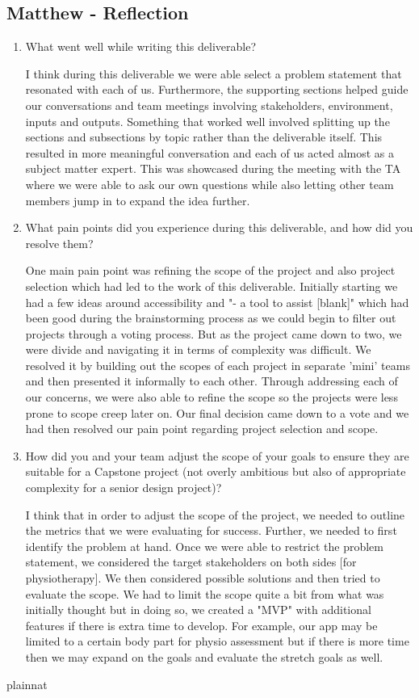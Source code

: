 \documentclass{article}
\begin{document}
\subsection*{Matthew - Reflection}
\begin{enumerate}
    \item What went well while writing this deliverable? 

    I think during this deliverable we were able select a problem statement that resonated with each of us.
    Furthermore, the supporting sections helped guide our conversations and team meetings involving stakeholders,
    environment, inputs and outputs. Something that worked well involved splitting up the sections and subsections
    by topic rather than the deliverable itself. This resulted in more meaningful conversation and each of us acted
    almost as a subject matter expert. This was showcased during the meeting with the TA where we were able to ask
    our own questions while also letting other team members jump in to expand the idea further.

    \item What pain points did you experience during this deliverable, and how
    did you resolve them?

    One main pain point was refining the scope of the project and also project selection which had led to the work
    of this deliverable. Initially starting we had a few ideas around accessibility and "- a tool to assist [blank]" which
    had been good during the brainstorming process as we could begin to filter out projects through a voting process.
    But as the project came down to two, we were divide and navigating it in terms of complexity was difficult. We resolved
    it by building out the scopes of each project in separate 'mini' teams and then presented it informally to each other.
    Through addressing each of our concerns, we were also able to refine the scope so the projects were less prone to
    scope creep later on. Our final decision came down to a vote and we had then resolved our pain point regarding project
    selection and scope.

    \item How did you and your team adjust the scope of your goals to ensure
    they are suitable for a Capstone project (not overly ambitious but also of
    appropriate complexity for a senior design project)?

    I think that in order to adjust the scope of the project, we needed to outline the metrics that we were evaluating for 
    success. Further, we needed to first identify the problem at hand. Once we were able to restrict the problem statement,
    we considered the target stakeholders on both sides [for physiotherapy]. We then considered possible solutions and then
    tried to evaluate the scope. We had to limit the scope quite a bit from what was initially thought but in doing so, we
    created a "MVP" with additional features if there is extra time to develop. For example, our app may be limited to a 
    certain body part for physio assessment but if there is more time then we may expand on the goals and evaluate the 
    stretch goals as well.
\end{enumerate}  

 {plainnat}

\end{document}
